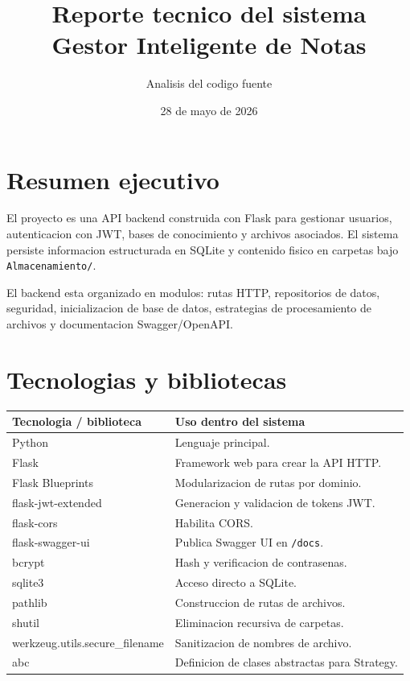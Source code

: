 \documentclass[12pt,a4paper]{article}
\title{Reporte tecnico del sistema\\Gestor Inteligente de Notas}
\author{Analisis del codigo fuente}
\date{28 de mayo de 2026}
\begin{document}
\maketitle
\tableofcontents
\newpage

\section{Resumen ejecutivo}

El proyecto es una API backend construida con Flask para gestionar usuarios, autenticacion con JWT, bases de conocimiento y archivos asociados. El sistema persiste informacion estructurada en SQLite y contenido fisico en carpetas bajo \texttt{Almacenamiento/}.

El backend esta organizado en modulos: rutas HTTP, repositorios de datos, seguridad, inicializacion de base de datos, estrategias de procesamiento de archivos y documentacion Swagger/OpenAPI.

\section{Tecnologias y bibliotecas}

\begin{longtable}{|p{4cm}|p{10cm}|}
\hline
\textbf{Tecnologia / biblioteca} & \textbf{Uso dentro del sistema} \\
\hline
Python & Lenguaje principal. \\
\hline
Flask & Framework web para crear la API HTTP. \\
\hline
Flask Blueprints & Modularizacion de rutas por dominio. \\
\hline
flask-jwt-extended & Generacion y validacion de tokens JWT. \\
\hline
flask-cors & Habilita CORS. \\
\hline
flask-swagger-ui & Publica Swagger UI en \texttt{/docs}. \\
\hline
bcrypt & Hash y verificacion de contrasenas. \\
\hline
sqlite3 & Acceso directo a SQLite. \\
\hline
pathlib & Construccion de rutas de archivos. \\
\hline
shutil & Eliminacion recursiva de carpetas. \\
\hline
werkzeug.utils.secure\_filename & Sanitizacion de nombres de archivo. \\
\hline
abc & Definicion de clases abstractas para Strategy. \\
\hline
\end{longtable}
\end{document}
